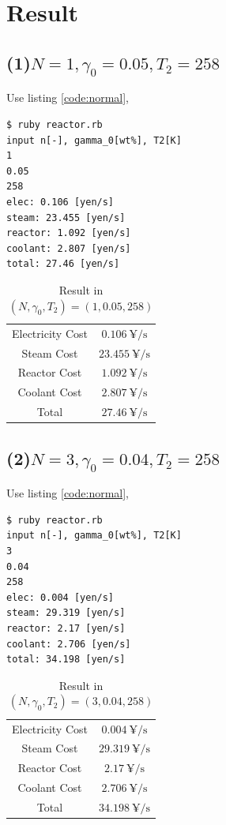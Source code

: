 \documentclass[a4paper,titlepage]{article}
\begin{document}
  \section{Result}

  \subsection*{(1)$N=1, \gamma_0=0.05, T_2 = 258$}
  Use listing \ref{code:normal},
  \begin{screen}
    \begin{verbatim}
$ ruby reactor.rb
input n[-], gamma_0[wt%], T2[K]
1
0.05
258
elec: 0.106 [yen/s]
steam: 23.455 [yen/s]
reactor: 1.092 [yen/s]
coolant: 2.807 [yen/s]
total: 27.46 [yen/s]\end{verbatim}
  \end{screen}

  \begin{table}[htbp]
    \centering
    \begin{tabular}{cc}\hline
      Electricity Cost & $\SI{0.106}{\yen\per\second}$ \\
      Steam Cost & $\SI{23.455}{\yen\per\second}$ \\
      Reactor Cost & $\SI{1.092}{\yen\per\second}$ \\
      Coolant Cost & $\SI{2.807}{\yen\per\second}$ \\
      Total & $\SI{27.46}{\yen\per\second}$ \\ \hline
    \end{tabular}
    \caption{Result in $(N, \gamma_0, T_2) = (1, 0.05, 258)$}
  \end{table}

  \subsection*{(2)$N=3, \gamma_0=0.04, T_2 = 258$}
  Use listing \ref{code:normal},
  \begin{screen}
    \begin{verbatim}
$ ruby reactor.rb
input n[-], gamma_0[wt%], T2[K]
3
0.04
258
elec: 0.004 [yen/s]
steam: 29.319 [yen/s]
reactor: 2.17 [yen/s]
coolant: 2.706 [yen/s]
total: 34.198 [yen/s]\end{verbatim}
  \end{screen}

  \begin{table}[htbp]
    \centering
    \begin{tabular}{cc}\hline
      Electricity Cost & $\SI{0.004}{\yen\per\second}$ \\
      Steam Cost & $\SI{29.319}{\yen\per\second}$ \\
      Reactor Cost & $\SI{2.17}{\yen\per\second}$ \\
      Coolant Cost & $\SI{2.706}{\yen\per\second}$ \\
      Total & $\SI{34.198}{\yen\per\second}$ \\ \hline
    \end{tabular}
    \caption{Result in $(N, \gamma_0, T_2) = (3, 0.04, 258)$}
  \end{table}
\end{document}
